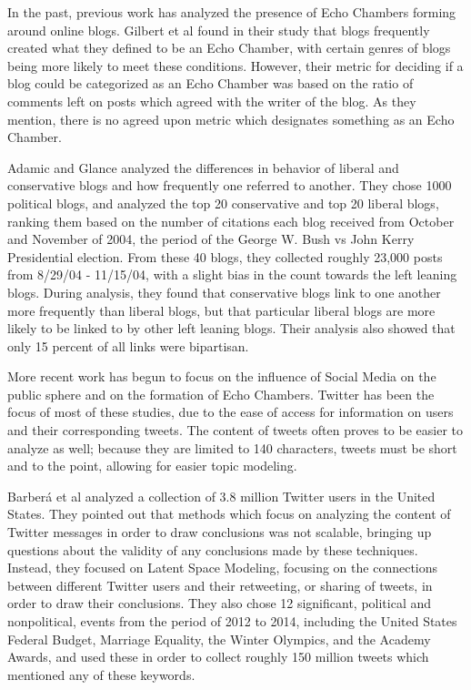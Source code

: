 \documentclass[journal]{IEEEtran}
\begin{document}
	In the past, previous work has analyzed the presence of Echo Chambers forming around online blogs. Gilbert et al \cite{gilbert} found in their study that blogs frequently created what they defined to be an Echo Chamber, with certain genres of blogs being more likely to meet these conditions. However, their metric for deciding if a blog could be categorized as an Echo Chamber was based on the ratio of comments left on posts which agreed with the writer of the blog. As they mention, there is no agreed upon metric which designates something as an Echo Chamber. 

	Adamic and Glance \cite{adamic} analyzed the differences in behavior of liberal and conservative blogs and how frequently one referred to another. They chose 1000 political blogs, and analyzed the top 20 conservative and top 20 liberal blogs, ranking them based on the number of citations each blog received from October and November of 2004, the period of the George W. Bush vs John Kerry Presidential election. From these 40 blogs, they collected roughly 23,000 posts from 8/29/04 - 11/15/04, with a slight bias in the count towards the left leaning blogs. During analysis, they found that conservative blogs link to one another more frequently than liberal blogs, but that particular liberal blogs are more likely to be linked to by other left leaning blogs. Their analysis also showed that only 15 percent of all links were bipartisan. 
	
	More recent work has begun to focus on the influence of Social Media on the public sphere and on the formation of Echo Chambers. Twitter has been the focus of most of these studies, due to the ease of access for information on users and their corresponding tweets. The content of tweets often proves to be easier to analyze as well; because they are limited to 140 characters, tweets must be short and to the point, allowing for easier topic modeling. 
	
	Barberá et al \cite{barbera} analyzed a collection of 3.8 million Twitter users in the United States. They pointed out that methods which focus on analyzing the content of Twitter messages in order to draw conclusions was not scalable, bringing up questions about the validity of any conclusions made by these techniques. Instead, they focused on Latent Space Modeling, focusing on the connections between different Twitter users and their retweeting, or sharing of tweets, in order to draw their conclusions. They also chose 12 significant, political and nonpolitical, events from the period of 2012 to 2014, including the United States Federal Budget, Marriage Equality, the Winter Olympics, and the Academy Awards, and used these in order to collect roughly 150 million tweets which mentioned any of these keywords. 
\end{document}
